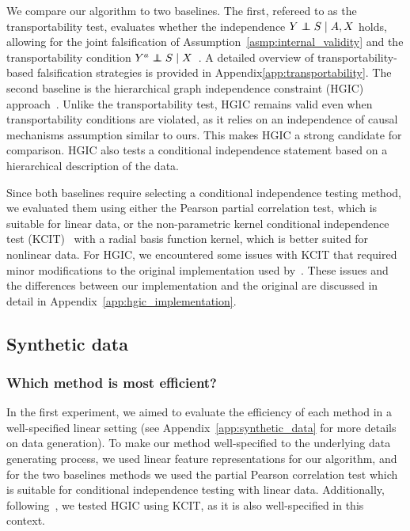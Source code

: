 \documentclass{article}
\begin{document}
We compare our algorithm to two baselines. The first, refereed to as the transportability test, evaluates whether the independence $Y\indep S \mid A, X$ holds, allowing for the joint falsification of Assumption~\ref*{asmp:internal_validity} and the transportability condition $Y^a\indep S \mid X$~\citep{dahabreh2020benchmarking}. A detailed overview of transportability-based falsification strategies is provided in Appendix\ref{app:transportability}. The second baseline is the hierarchical graph independence constraint (HGIC) approach~\citep{karlsson2023detecting}. Unlike the transportability test, HGIC remains valid even when transportability conditions are violated, as it relies on an independence of causal mechanisms assumption similar to ours. This makes HGIC a strong candidate for comparison. HGIC also tests a conditional independence statement based on a hierarchical description of the data.

Since both baselines require selecting a conditional independence testing method, we evaluated them using either the Pearson partial correlation test, which is suitable for linear data, or the non-parametric kernel conditional independence test (KCIT)~\citep{zhang2011kernel} with a radial basis function kernel, which is better suited for nonlinear data. For HGIC, we encountered some issues with KCIT that required minor modifications to the original implementation used by~\citet{karlsson2023detecting}. These issues and the differences between our implementation and the original are discussed in detail in Appendix~\ref{app:hgic_implementation}.

\subsection{Synthetic data}


\subsubsection{Which method is most efficient?} \label{sec:efficiency_experiment}
In the first experiment, we aimed to evaluate the efficiency of each method in a well-specified linear setting (see Appendix~\ref{app:synthetic_data} for more details on data generation). To make our method well-specified to the underlying data generating process, we used linear feature representations for our algorithm, and for the two baselines methods we used the partial Pearson correlation test which is suitable for conditional independence testing with linear data. Additionally, following~\citet{karlsson2023detecting}, we tested HGIC using KCIT, as it is also well-specified in this context.
\end{document}
